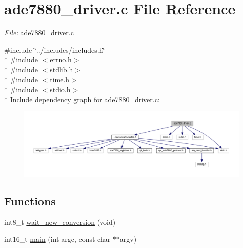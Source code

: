 \hypertarget{a00035}{\section{ade7880\-\_\-driver.\-c File Reference}
\label{d4/d8c/a00035}
}


{\itshape File\-:} \hyperlink{a00035}{ade7880\-\_\-driver.\-c} \par
  


{\ttfamily \#include \char`\"{}../includes/includes.\-h\char`\"{}}\\*
{\ttfamily \#include $<$errno.\-h$>$}\\*
{\ttfamily \#include $<$stdlib.\-h$>$}\\*
{\ttfamily \#include $<$time.\-h$>$}\\*
{\ttfamily \#include $<$stdio.\-h$>$}\\*
Include dependency graph for ade7880\-\_\-driver.\-c\-:\nopagebreak
\begin{figure}[H]
\begin{center}
\leavevmode
\includegraphics[width=350pt]{d6/d97/a00045}
\end{center}
\end{figure}
\subsection*{Functions}
{\bf }\par
\begin{DoxyCompactItemize}
\item 
int8\-\_\-t \hyperlink{a00003_ga7b6d584350762c53419945480d6958d3}{wait\-\_\-new\-\_\-conversion} (void)
\begin{DoxyCompactList}\small\item\em 

 \end{DoxyCompactList}\end{DoxyCompactItemize}

{\bf }\par
\begin{DoxyCompactItemize}
\item 
int16\-\_\-t \hyperlink{a00003_ga3ba649a584853038d5fd50ad1751379d}{main} (int argc, const char $\ast$$\ast$argv)
\begin{DoxyCompactList}\small\item\em 

 \end{DoxyCompactList}\end{DoxyCompactItemize}

